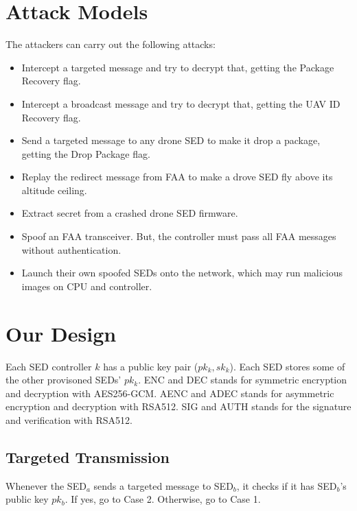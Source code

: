\documentclass[11pt,oneside,onecolumn,letterpaper]{article}
\begin{document}
\section{Attack Models}

The attackers can carry out the following attacks:

\begin{itemize}
	\item Intercept a targeted message and try to decrypt that, getting the Package Recovery flag.

	\item Intercept a broadcast message and try to decrypt that, getting the UAV ID Recovery flag.	
	
	\item Send a targeted message to any drone SED to make it drop a package, getting the Drop Package flag.		
	
	\item Replay the redirect message from FAA to make a drove SED fly above its altitude ceiling.
	
	\item Extract secret from a crashed drone SED firmware.  
	
	\item Spoof an FAA transceiver. But, the controller must pass all FAA messages without authentication.
	
	\item Launch their own spoofed SEDs onto the network, which may run malicious images on CPU and controller.
\end{itemize}

\section{Our Design}
Each SED controller $k$ has a public key pair ($pk_k, sk_k$).
Each SED stores some of the other provisoned SEDs' $pk_k$.
ENC and DEC stands for symmetric encryption and decryption with AES256-GCM.
AENC and ADEC stands for asymmetric encryption and decryption with RSA512.
SIG and AUTH stands for the signature and verification with RSA512.

\subsection{Targeted Transmission}
Whenever the SED$_a$ sends a targeted message to SED$_b$, it checks if it has SED$_b$'s public key $pk_b$. If yes, go to Case 2. Otherwise, go to Case 1.
\end{document}
